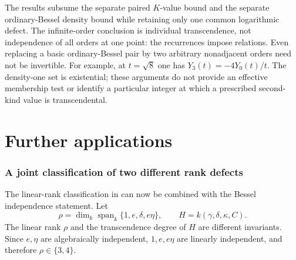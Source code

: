 \documentclass[11pt]{article}
\theoremstyle{definition}
\theoremstyle{remark}
\begin{document}
The results subsume the separate paired $K$-value bound and the separate
ordinary-Bessel density bound while retaining only one common
logarithmic defect. The infinite-order conclusion is individual
transcendence, not independence of all orders at one point: the
recurrences impose relations. Even replacing a basic ordinary-Bessel
pair by two arbitrary nonadjacent orders need not be invertible. For
example, at $t=\sqrt8$ one has $Y_3(t)=-4Y_0(t)/t$.
The density-one set is existential; these arguments do not provide an
effective membership test or identify a particular integer at which
a prescribed second-kind value is transcendental.

\part{Further applications}
\section{A joint classification of two different rank defects}

The linear-rank classification in \cite{Source021} can now be combined with the Bessel independence statement. Let
\[
 \rho=\dim_k\operatorname{span}_k\{1,e,\delta,e\eta\},\qquad
 H=k(\gamma,\delta,\kappa,C).
\]
The linear rank $\rho$ and the transcendence degree of $H$ are different
invariants. Since $e,\eta$ are algebraically independent, $1,e,e\eta$ are
linearly independent, and therefore $\rho\in\{3,4\}$.
\end{document}
